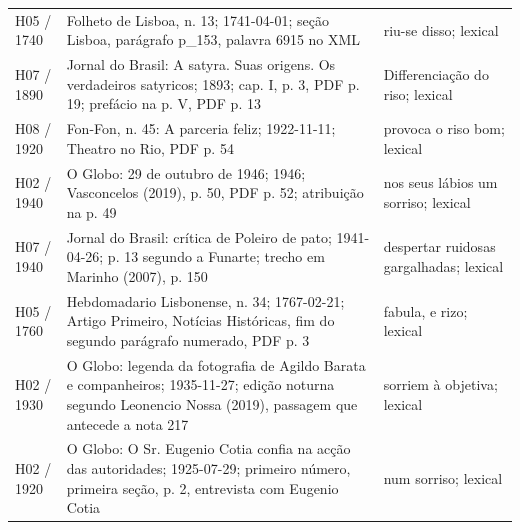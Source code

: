 \begin{longtable}{>{\raggedright\arraybackslash}p{}>{\raggedright\arraybackslash}p{}>{\raggedright\arraybackslash}p{}}
H05 / 1740 & Folheto de Lisboa, n. 13; 1741-04-01; seção Lisboa, parágrafo p\_153, palavra 6915 no XML & riu-se disso; lexical \cite{acervoD128} \\
H07 / 1890 & Jornal do Brasil: A satyra. Suas origens. Os verdadeiros satyricos; 1893; cap. I, p. 3, PDF p. 19; prefácio na p. V, PDF p. 13 & Differenciação do riso; lexical \cite{acervoD129} \\
H08 / 1920 & Fon-Fon, n. 45: A parceria feliz; 1922-11-11; Theatro no Rio, PDF p. 54 & provoca o riso bom; lexical \cite{acervoD130} \\
H02 / 1940 & O Globo: 29 de outubro de 1946; 1946; Vasconcelos (2019), p. 50, PDF p. 52; atribuição na p. 49 & nos seus lábios um sorriso; lexical \cite{acervoD131} \\
H07 / 1940 & Jornal do Brasil: crítica de Poleiro de pato; 1941-04-26; p. 13 segundo a Funarte; trecho em Marinho (2007), p. 150 & despertar ruidosas gargalhadas; lexical \cite{acervoD132} \\
H05 / 1760 & Hebdomadario Lisbonense, n. 34; 1767-02-21; Artigo Primeiro, Notícias Históricas, fim do segundo parágrafo numerado, PDF p. 3 & fabula, e rizo; lexical \cite{acervoD133} \\
H02 / 1930 & O Globo: legenda da fotografia de Agildo Barata e companheiros; 1935-11-27; edição noturna segundo Leonencio Nossa (2019), passagem que antecede a nota 217 & sorriem à objetiva; lexical \cite{acervoD134} \\
H02 / 1920 & O Globo: O Sr. Eugenio Cotia confia na acção das autoridades; 1925-07-29; primeiro número, primeira seção, p. 2, entrevista com Eugenio Cotia & num sorriso; lexical \cite{acervoD135} \\
\bottomrule\end{longtable}\normalsize
